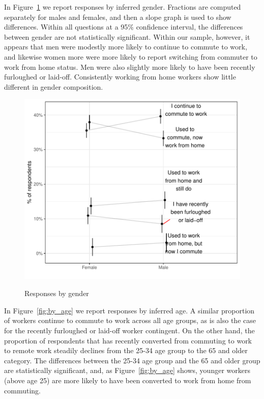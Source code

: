 \documentclass[12pt]{article}
\begin{document}
In Figure~\ref{fig:gender} we report responses by inferred gender.
Fractions are computed separately for males and females, and then a slope graph is used to show differences. Within all questions at a 95\% confidence interval, the differences between gender are not statistically significant. Within our sample, however, it appears that men were modestly more likely to continue to commute to work, and likewise women more were more likely to report switching from commuter to work from home status. Men were also slightly more likely to have been recently furloughed or laid-off. Consistently working from home workers show little different in gender composition.

\begin{figure}
  \caption{Responses by gender} \label{fig:gender}
\centering
\begin{minipage}{1.0 \linewidth}
  \includegraphics[width = \linewidth]{plots/gender.pdf} \\
  \begin{footnotesize}
    \begin{singlespace}
    \end{singlespace}
    \end{footnotesize}
\end{minipage}
\end{figure} 


In Figure~\ref{fig:by_age} we report responses by inferred age.
A similar proportion of workers continue to commute to work across all age groups, as is also the case for the recently furloughed or laid-off worker contingent.
On the other hand, the proportion of respondents that has recently converted from commuting to work to remote work steadily declines from the 25-34 age group to the 65 and older category. The differences between the 25-34 age group and the 65 and older group are statistically significant, and, as Figure~\ref{fig:by_age} shows, younger workers (above age 25) are more likely to have been converted to work from home from commuting. 
\end{document}
